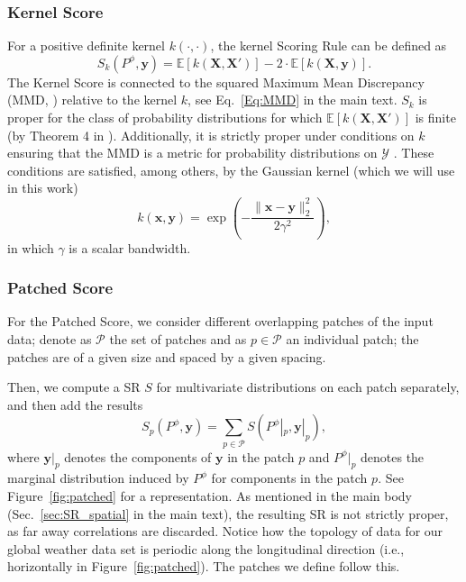 \documentclass[twoside,11pt]{article}
\newcommand{\E}{\mathbb{E}}
\newcommand{\Y}{\mathcal{Y}}
\newcommand{\ddsim}{\mathbf{x}}
\newcommand{\ddobs}{\mathbf{y}}
\newcommand{\Ddsim}{\mathbf{X}}
\begin{document}
	
	\subsubsection{Kernel Score}
	For a positive definite kernel $ k(\cdot, \cdot) $, the kernel Scoring Rule can be defined as \citep{gneiting2007strictly} \begin{equation}\label{Eq:kernel_score2}
	S_k(P^\phi, \ddobs) = \E[k(\Ddsim,\Ddsim')] - 2\cdot\E [k(\Ddsim, \ddobs)].
	\end{equation}
	The Kernel Score is connected to the squared Maximum Mean Discrepancy (MMD, \citealp{gretton2012kernel}) relative to the kernel $ k $, see Eq.~\eqref{Eq:MMD} in the main text.
	$ S_k $ is proper for the class of probability distributions for which $ \E[k(\Ddsim,\Ddsim')] $ is finite (by Theorem 4 in \citealp{gneiting2007strictly}). Additionally, it is strictly proper under conditions on $ k $ ensuring that the MMD is a metric for probability distributions on $ \Y $ \cite{gretton2012kernel}. These conditions are satisfied, among others, by the Gaussian kernel (which we will use in this work)
	\begin{equation}\label{Eq:gau_k}
	k(\ddsim, \ddobs)=\exp \left(-\frac{\|\ddsim-\ddobs\|_{2}^{2}}{2 \gamma^{2}}\right),
	\end{equation}
	in which $ \gamma $ is a scalar bandwidth. 
	
	\FloatBarrier
	\subsubsection{Patched Score}
	\FloatBarrier
	
	For the Patched Score, we consider different overlapping patches of the input data; denote as $ \mathcal{P} $ the set of patches and as $ p \in \mathcal{P} $ an individual patch; the patches are of a given size and spaced by a given spacing. 
	
	Then, we compute a SR $ S $ for multivariate distributions on each patch separately, and then add the results
	\begin{equation}\label{Eq:patched_SR}
	S_{p}(P^\phi, \ddobs) = \sum_{p \in \mathcal{P}} S(P^\phi|_p, \ddobs|_p),
	\end{equation}
	where $ \ddobs|_p$ denotes the components of $ \ddobs $ in the patch $ p $ and $ P^\phi|_p $ denotes the marginal distribution induced by $ P^\phi $ for components in the patch $ p $. See Figure~\ref{fig:patched} for a representation. As mentioned in the main body (Sec.~\ref{sec:SR_spatial} in the main text), the resulting SR is not strictly proper, as far away correlations are discarded. Notice how the topology of data for our global weather data set is periodic along the longitudinal direction (i.e., horizontally in Figure~\ref{fig:patched}). The patches we define follow this.
	
\end{document}
